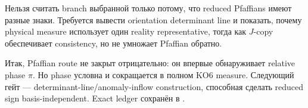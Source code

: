 \begin{nogocriterion}
Нельзя считать branch выбранной только потому, что reduced Pfaffians имеют
разные знаки. Требуется вывести orientation determinant line и показать,
почему physical measure использует один reality representative, тогда как
\(J\)-copy обеспечивает consistency, но не умножает Pfaffian обратно.
\end{nogocriterion}

Итак, Pfaffian route не закрыт отрицательно: он впервые обнаруживает relative
phase \(\pi\). Но phase условна и сокращается в полном KO6 measure.
Следующий гейт --- determinant-line/anomaly-inflow construction, способная
сделать reduced sign basis-independent. Exact ledger сохранён в
.